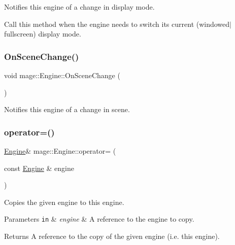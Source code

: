 Notifies this engine of a change in display mode.

Call this method when the engine needs to switch its current (windowed$\vert$fullscreen) display mode. \hypertarget{classmage_1_1_engine_a4bcc8811433865c349c8cc862d4f457d}{}\label{classmage_1_1_engine_a4bcc8811433865c349c8cc862d4f457d} 
\subsubsection{\texorpdfstring{On\+Scene\+Change()}{OnSceneChange()}}
{\footnotesize\ttfamily void mage\+::\+Engine\+::\+On\+Scene\+Change (\begin{DoxyParamCaption}{ }\end{DoxyParamCaption})\hspace{0.3cm}{\ttfamily [noexcept]}}

Notifies this engine of a change in scene. \hypertarget{classmage_1_1_engine_a1eedff82d4c8207c61676230520648fd}{}\label{classmage_1_1_engine_a1eedff82d4c8207c61676230520648fd} 
\subsubsection{\texorpdfstring{operator=()}{operator=()}\hspace{0.1cm}{\footnotesize\ttfamily [1/2]}}
{\footnotesize\ttfamily \hyperlink{classmage_1_1_engine}{Engine}\& mage\+::\+Engine\+::operator= (\begin{DoxyParamCaption}\item[{const \hyperlink{classmage_1_1_engine}{Engine} \&}]{engine }\end{DoxyParamCaption})\hspace{0.3cm}{\ttfamily [delete]}}

Copies the given engine to this engine.


\begin{DoxyParams}[1]{Parameters}
\mbox{\tt in}  & {\em engine} & A reference to the engine to copy. \\
\hline
\end{DoxyParams}
\begin{DoxyReturn}{Returns}
A reference to the copy of the given engine (i.\+e. this engine). 
\end{DoxyReturn}
\hypertarget{classmage_1_1_engine_a22607a263e0be5e179cc0e4bf13b18f7}{}\label{classmage_1_1_engine_a22607a263e0be5e179cc0e4bf13b18f7} 
